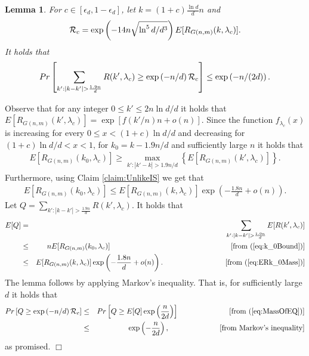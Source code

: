 \documentclass[a4paper,10pt]{article}
\makeatletter
\newtheorem{lemma}{Lemma}\renewcommand{\thelemma}{\arabic{lemma}}
\newenvironment{proof}{\noindent{\bf Proof\@:}}{\hfill $\Box$\\}
\makeatother
\begin{document}
\begin{lemma}\label{lemma:AlmostMostLikelyIS}
For $c\in [\epsilon_d,1-\epsilon_d]$,  let $k=(1+c)\frac{\ln d}{d}n$
and
$${\cal R}_{c}=\exp\left(-14n\sqrt{{\ln^5 d}/{d^{3}}}\right)E[R_{G(n,m)}(k,\lambda_{c})].$$ 
It holds that
\begin{displaymath}
Pr\left[ \sum_{k': |k-k'|>\frac{1.9 n}{d}}R(k', \lambda_{c})\geq
\exp\left(-n/d \right) {\cal R}_{c} \right]\leq \exp\left(-n/(2d) \right).
\end{displaymath}
\end{lemma}
\begin{proof}
Observe that for any integer $0\leq k'\leq 2n\ln d/d$ it holds that
$E[R_{G(n,m)}(k',\lambda_c)]=\exp\left[f(k'/n)n+o(n)\right]$. 
Since the function $f_{\lambda_c}(x)$ is increasing for every 
$0\leq x < (1+c)\ln d/d $ and decreasing for $(1+c)\ln d/d<x<1$, for 
$k_0=k-1.9n/d$ and sufficiently large $n$ it holds  that
\begin{eqnarray}\label{eq:k_0Bound}
E[R_{G(n,m)}(k_0,\lambda_c)]\geq \max_{k':|k'- k|>1.9n/d}\left\{E[R_{G(n,m)}(k',\lambda_c)]\right\}.
\end{eqnarray}
Furthermore, using Claim \ref{claim:UnlikeIS} we get that
\begin{eqnarray}\label{eq:ERk_0Mass}
E[R_{G(n,m)}(k_0,\lambda_c)]\leq E[R_{G(n,m)}(k,\lambda_c)]\exp\left(-\frac{1.8n}{d}+o(n)\right).
\end{eqnarray}
Let $Q=\sum_{k': |k-k'|>\frac{1.9n}{d}}R(k', \lambda_{c})$. 
It holds that
\begin{eqnarray}
E[Q]&=&\sum_{k': |k-k'|>\frac{1.9n}{d}}E[R(k', \lambda_{c})] 
\nonumber \\
&\leq&  n E[R_{G(n,m)}(k_0,\lambda_c)] \hspace*{5.8cm} \mbox{[from (\ref{eq:k_0Bound})]} 
\nonumber \\
&\leq & E[R_{G(n,m)}(k,\lambda_c)]\exp\left(-\frac{1.8n}{d}+o(n)\right).
\hspace*{3cm} \mbox{[from (\ref{eq:ERk_0Mass})]} 
\label{eq:MassOfEQ}
\end{eqnarray}
The lemma follows by applying Markov's inequality. That is,
for sufficiently large $d$ it holds that
\begin{eqnarray}
Pr\left[Q\geq \exp\left(-n/d \right) {\cal R}_{c} \right]&\leq &
Pr\left[Q\geq E[Q]\exp\left(\frac{n}{2d}\right)\right] \hspace*{2.4cm} \mbox{[from (\ref{eq:MassOfEQ})]}
\nonumber\\
&\leq& \exp\left(-\frac{n}{2d}\right), \hspace*{2.4cm} \mbox{[from Markov's inequality]}\nonumber
\end{eqnarray}
as promised.
\end{proof}
\end{document}
